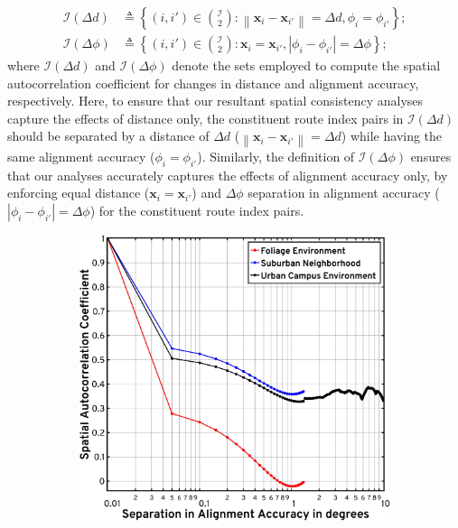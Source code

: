 \documentclass[10pt, twocolumn]{IEEEtran}
\newcommand{\abs}[1]{\left\lvert#1\right\rvert}
\newcommand{\norm}[1]{\left\lVert#1\right\rVert}
\begin{document}
{\begin{align}\label{E}
    \mathcal{I}(\Delta d)&{\triangleq}\left\{(i,i'){\in}\binom{\mathcal{I}}{2}:\norm{\mathbf{x}_{i}{-}\mathbf{x}_{i'}}{=}\Delta d,\phi_{i}{=}\phi_{i'}\right\};\\
    \mathcal{I}(\Delta\phi)&{\triangleq}\left\{(i,i'){\in}\binom{\mathcal{I}}{2}:\mathbf{x}_{i}{=}\mathbf{x}_{i'},\abs{\phi_{i}{-}\phi_{i'}}{=}\Delta\phi\right\}\label{Ea};
\end{align}
where $\mathcal{I}(\Delta d)$ and $\mathcal{I}(\Delta \phi)$ denote the sets employed to compute the spatial autocorrelation coefficient for changes in distance and alignment accuracy, respectively. Here, to ensure that our resultant spatial consistency analyses capture the effects of distance only, the constituent route index pairs in $\mathcal{I}(\Delta d)$ should be separated by a distance of $\Delta d$ ($\norm{\mathbf{x}_{i}{-}\mathbf{x}_{i'}}{=}\Delta d$) while having the same alignment accuracy ($\phi_{i}{=}\phi_{i'}$). Similarly, the definition of $\mathcal{I}(\Delta \phi)$ ensures that our analyses accurately captures the effects of alignment accuracy only, by enforcing equal distance ($\mathbf{x}_{i}{=}\mathbf{x}_{i'}$) and $\Delta \phi$ separation in alignment accuracy ($\abs{\phi_{i}{-}\phi_{i'}}{=}\Delta \phi$) for the constituent route index pairs.\\
\begin{figure} [t]
    \centering
    \begin{subfigure}{0.4925\linewidth}
        \centering
        \includegraphics[width=0.95\linewidth]{figs/spatial_consistency_vs_alignment_accuracy.pdf}

\end{subfigure}
\end{figure}}
\end{document}
